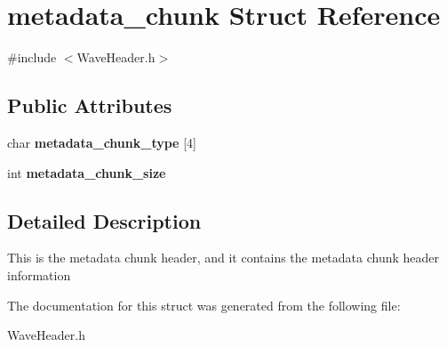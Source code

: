 \hypertarget{structmetadata__chunk}{}\section{metadata\+\_\+chunk Struct Reference}
\label{structmetadata__chunk}


{\ttfamily \#include $<$Wave\+Header.\+h$>$}

\subsection*{Public Attributes}
\begin{DoxyCompactItemize}
\item 
\mbox{\label{structmetadata__chunk_a745472e568604b58fbebfbf8260a1e43}} 
char {\bfseries metadata\+\_\+chunk\+\_\+type} \mbox{[}4\mbox{]}
\item 
\mbox{\label{structmetadata__chunk_a9c643ddf4c65b6f2559f0aa7e1059fa5}} 
int {\bfseries metadata\+\_\+chunk\+\_\+size}
\end{DoxyCompactItemize}


\subsection{Detailed Description}
This is the metadata chunk header, and it contains the metadata chunk header information 

The documentation for this struct was generated from the following file\+:\begin{DoxyCompactItemize}
\item 
Wave\+Header.\+h\end{DoxyCompactItemize}
